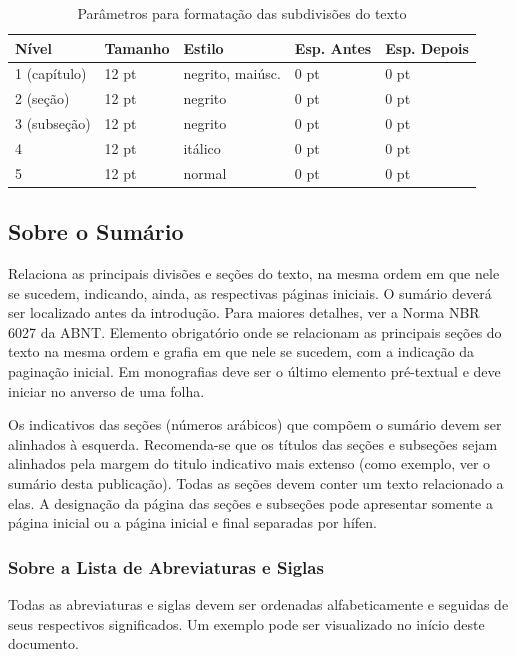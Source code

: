 \documentclass[
	oneside,
	english,brazil,
	mestrado,ppgc]{infufrgs}
\begin{document}
\begin{table}[htbp]
	\centering
	\caption{Parâmetros para formatação das subdivisões do texto}
    \label{tab:espacamentos}

	\begin{tabular}{lllll} \toprule
		Nível        & Tamanho & Estilo           & Esp. Antes & Esp. Depois \\ \midrule
		1 (capítulo) & 12 pt   & negrito, maiúsc. & 0 pt       & 0 pt \\
		2 (seção)    & 12 pt   & negrito          & 0 pt       & 0 pt \\
		3 (subseção) & 12 pt   & negrito          & 0 pt       & 0 pt \\
		4            & 12 pt   & itálico          & 0 pt       & 0 pt \\
		5            & 12 pt   & normal           & 0 pt       & 0 pt \\ \bottomrule
	\end{tabular}

\end{table}

\subsection{Sobre o Sumário}
Relaciona as principais divisões e seções do texto, na mesma ordem em que nele
se sucedem, indicando, ainda, as respectivas páginas iniciais. O sumário deverá
ser localizado antes da introdução. Para maiores detalhes, ver a Norma NBR 6027
da ABNT. Elemento obrigatório onde se relacionam as principais seções do texto
na mesma ordem e grafia em que nele se sucedem, com a indicação da paginação
inicial. Em monografias deve ser o último elemento pré-textual e deve iniciar
no anverso de uma folha.

Os indicativos das seções (números arábicos) que compõem o sumário devem ser
alinhados à esquerda. Recomenda-se que os títulos das seções e subseções sejam
alinhados pela margem do titulo indicativo mais extenso (como exemplo, ver o
sumário desta publicação). Todas as seções devem conter um texto relacionado a
elas. A designação da página das seções e subseções pode apresentar somente a
página inicial ou a página inicial e final separadas por hífen.

\subsubsection{Sobre a Lista de Abreviaturas e Siglas}
Todas as abreviaturas e siglas devem ser ordenadas alfabeticamente e seguidas
de seus respectivos significados. Um exemplo pode ser visualizado no início
deste documento.
\end{document}
